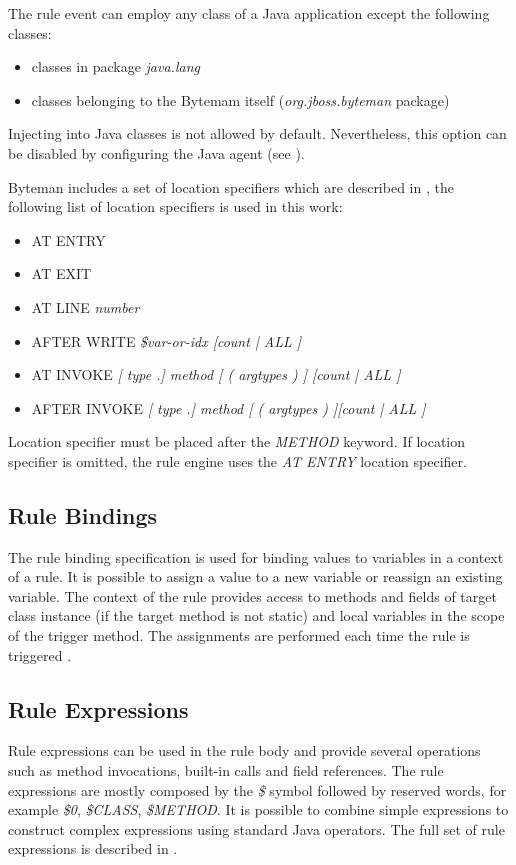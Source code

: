\documentclass[12pt,oneside]{fithesis2}
\begin{document}
The rule event can employ any class of a Java application except the following classes:

\begin{itemize}
   \item classes in package \textit{java.lang}
   \item classes belonging to the Bytemam itself (\textit{org.jboss.byteman} package)
\end{itemize}

Injecting into Java classes is not allowed by default. Nevertheless, this option can be disabled by configuring the Java agent (see \cite[Available -javaagent Options]{byteman_doc}).

Byteman includes a set of location specifiers which are described in \cite[Location Specifiers]{byteman_doc}, the following list of location specifiers is used in this work:

\begin{itemize}
\item	AT ENTRY
\item	AT EXIT
\item	AT LINE \textit{number}
\item	AFTER WRITE \textit{\$var-or-idx [count | ALL ]}
\item	AT INVOKE \textit{[ type .] method [ ( argtypes ) ] [count | ALL ]}
\item	AFTER INVOKE \textit{[ type .] method [ ( argtypes ) ][count | ALL ]}
\end{itemize}

Location specifier must be placed after the \textit{METHOD} keyword. If location specifier is omitted, the rule engine uses the \textit{AT ENTRY} location specifier.

\subsection{Rule Bindings}
\label{subsec:rule_bindings}
The rule binding specification is used for binding values to variables in a context of a rule. It is possible to assign a value to a new variable or reassign an existing variable. The context of the rule provides access to methods and fields of target class instance (if the target method is not static) and local variables in the scope of the trigger method. The assignments are performed each time the rule is triggered \cite[Rule Bindings]{byteman_doc}.

\subsection{Rule Expressions}
\label{rule_exp}
Rule expressions can be used in the rule body and provide several operations such as method invocations, built-in calls and field references. The rule expressions are mostly composed by the \textit{\$} symbol followed by reserved words, for example \textit{\$0}, \textit{\$CLASS}, \textit{\$METHOD}. It is possible to combine simple expressions to construct complex expressions using standard Java operators. The full set of rule expressions is described in \cite[Rule Expressions]{byteman_doc}.
\end{document}
